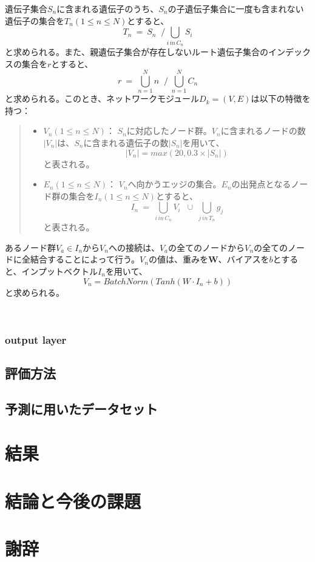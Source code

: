 \documentclass[a4paper,12pt]{jsreport}
\begin{document}
遺伝子集合$S_n$に含まれる遺伝子のうち、$S_n$の子遺伝子集合に一度も含まれない遺伝子の集合を$T_n(1\leq n\leq N)$とすると、
　$$T_n \: = \: S_n \; \; / \bigcup_{i\, in\, C_n} \! S_i$$
と求められる。また、親遺伝子集合が存在しないルート遺伝子集合のインデックスの集合を$r$とすると、
　$$r \: = \: \bigcup_{n=1}^{N} n \; \; / \;  \bigcup_{n=1}^{N} C_n$$
と求められる。このとき、ネットワークモジュール$D_k = (V, E)$は以下の特徴を持つ：

  \begin{quote}
  \begin{itemize}
  \item $V_n(1\leq n\leq N)$： $S_n$に対応したノード群。$V_n$に含まれるノードの数$|V_n|$は、$S_n$に含まれる遺伝子の数$|S_n|$を用いて、$$|V_n| = max(20, 0.3 \times |S_n|)$$と表される。
  \item $E_n(1\leq n\leq N)$： $V_n$へ向かうエッジの集合。$E_n$の出発点となるノード群の集合を$I_n(1\leq n\leq N)$とすると、$$I_n \: = \: \bigcup_{i\, in\, C_n} \! V_i \; \; \cup \;  \bigcup_{j\, in\, T_n} g_j$$と表される。
  \end{itemize}
  \end{quote}
 
 あるノード群$V_a \in I_n$から$V_n$への接続は、$V_a$の全てのノードから$V_n$の全てのノードに全結合することによって行う。$V_n$の値は、重みを$\bm{W}$、バイアスを$b$とすると、インプットベクトル$I_n$を用いて、$$V_n = BatchNorm(Tanh(W \cdot I_n + b))$$と求められる。
  
 
  
  
  
  
  
 
  


 

　




\subsection{output layer}


\section{評価方法}
\section{予測に用いたデータセット}

\chapter{結果}

\chapter{結論と今後の課題}

\chapter{謝辞}
\end{document}
